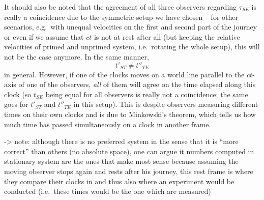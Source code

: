 \begin{ex}
	It should also be noted that the agreement of all three observers regarding $\tau_{SE}$ is really a coincidence due to the symmetric setup we have chosen -- for other scenarios, e.g.~with unequal velocities on the first and second part of the journey or even if we assume that $ct$ is not at rest after all (but keeping the relative velocities of primed and unprimed system, i.e.~rotating the whole setup), this will not be the case anymore. In the same manner,
	\begin{equation*}
		t'_{ST} \neq t''_{TE}
	\end{equation*}
	in general. However, if one of the clocks moves on a world line parallel to the $ct$-axis of one of the observers, \emph{all} of them will agree on the time elapsed along this clock (so $t_{SE}$ being equal for all observers is really not a coincidence; the same goes for $t'_{ST}$ and $t''_{TE}$ in this setup). This is despite observers measuring different times on their own clocks and is due to Minkowski's theorem, which tells us how much time has passed simultaneously on a clock in another frame.


-> note: although there is no preferred system in the sense that it is \enquote{more correct} than others (no absolute space), one can argue it numbers computed in stationary system are the ones that make most sense because assuming the moving observer stops again and rests after his journey, this rest frame is where they compare their clocks in and thus also where an experiment would be conducted (i.e.~these times would be the one which are measured)
\end{ex}



